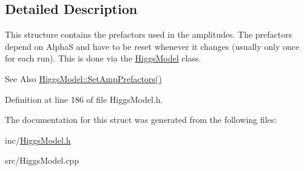 \subsection{Detailed Description}
This structure contains the prefactors used in the amplitudes. The prefactors depend on Alpha\-S and have to be reset whenever it changes (usually only once for each run). This is done via the \hyperlink{classHiggsModel}{Higgs\-Model} class. \begin{DoxySeeAlso}{See Also}
\hyperlink{classHiggsModel_a514e3dd7854409c622b8e200fe2ee84c}{Higgs\-Model\-::\-Set\-Amp\-Prefactors()} 
\end{DoxySeeAlso}


Definition at line 186 of file Higgs\-Model.\-h.



The documentation for this struct was generated from the following files\-:\begin{DoxyCompactItemize}
\item 
inc/\hyperlink{HiggsModel_8h}{Higgs\-Model.\-h}\item 
src/Higgs\-Model.\-cpp\end{DoxyCompactItemize}

